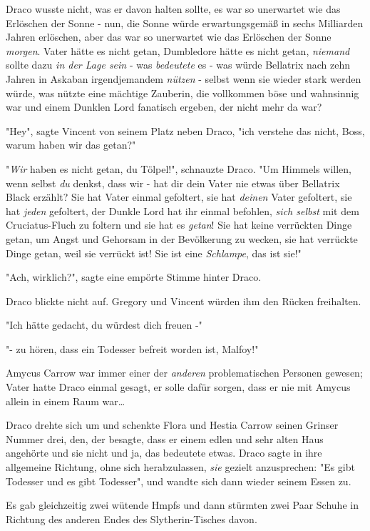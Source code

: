 {Draco wusste nicht, was er davon halten sollte, es war so unerwartet wie das Erlöschen der Sonne - nun, die Sonne würde erwartungsgemäß in sechs Milliarden Jahren erlöschen, aber das war so unerwartet wie das Erlöschen der Sonne \emph{morgen}. Vater hätte es nicht getan, Dumbledore hätte es nicht getan, \emph{niemand} sollte dazu \emph{in der Lage sein} - was \emph{bedeutete} es - was würde Bellatrix nach zehn Jahren in Askaban irgendjemandem \emph{nützen} - selbst wenn sie wieder stark werden würde, was nützte eine mächtige Zauberin, die vollkommen böse und wahnsinnig war und einem Dunklen Lord fanatisch ergeben, der nicht mehr da war?

"Hey", sagte Vincent von seinem Platz neben Draco, "ich verstehe das nicht, Boss, warum haben wir das getan?"

"\emph{Wir} haben es nicht getan, du Tölpel!", schnauzte Draco. "Um Himmels willen, wenn selbst \emph{du} denkst, dass wir - hat dir dein Vater nie etwas über Bellatrix Black erzählt? Sie hat Vater einmal gefoltert, sie hat \emph{deinen} Vater gefoltert, sie hat \emph{jeden} gefoltert, der Dunkle Lord hat ihr einmal befohlen, \emph{sich selbst} mit dem Cruciatus-Fluch zu foltern und sie hat es \emph{getan}! Sie hat keine verrückten Dinge getan, um Angst und Gehorsam in der Bevölkerung zu wecken, sie hat verrückte Dinge getan, weil sie verrückt ist! Sie ist eine \emph{Schlampe}, das ist sie!"

"Ach, wirklich?", sagte eine empörte Stimme hinter Draco.

Draco blickte nicht auf. Gregory und Vincent würden ihm den Rücken freihalten.

"Ich hätte gedacht, du würdest dich freuen -"

"- zu hören, dass ein Todesser befreit worden ist, Malfoy!"

Amycus Carrow war immer einer der \emph{anderen} problematischen Personen gewesen; Vater hatte Draco einmal gesagt, er solle dafür sorgen, dass er nie mit Amycus allein in einem Raum war…

Draco drehte sich um und schenkte Flora und Hestia Carrow seinen Grinser Nummer drei, den, der besagte, dass er einem edlen und sehr alten Haus angehörte und sie nicht und ja, das bedeutete etwas. Draco sagte in ihre allgemeine Richtung, ohne sich herabzulassen, \emph{sie} gezielt anzusprechen: "Es gibt Todesser und es gibt Todesser", und wandte sich dann wieder seinem Essen zu.

Es gab gleichzeitig zwei wütende Hmpfs und dann stürmten zwei Paar Schuhe in Richtung des anderen Endes des Slytherin-Tisches davon.

}
